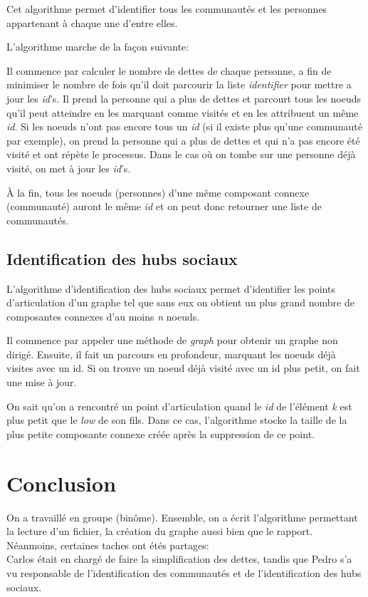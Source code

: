 \documentclass[11pt,a4paper]{article}
\begin{document}
Cet algorithme permet d'identifier tous les communautés et les
personnes appartenant à chaque une d'entre elles.\par L'algorithme
marche de la façon suivante:\par Il commence par calculer le nombre de
dettes de chaque personne, a fin de minimiser le nombre de fois qu'il
doit parcourir la liste \textit{identifier} pour mettre a jour les
\textit{id}'s.  Il prend la personne qui a plus de dettes et parcourt
tous les noeuds qu'il peut atteindre en les marquant comme visités et
en les attribuent un même \textit{id}.  Si les noeuds n'ont pas encore
tous un \textit{id} (si il existe plus qu'une communauté par exemple),
on prend la personne qui a plus de dettes et qui n'a pas encore été
visité et ont répète le processus.  Dans le cas où on tombe sur une
personne déjà visité, on met à jour les \textit{id}'s.\par À la fin,
tous les noeuds (personnes) d'une même composant connexe (communauté)
auront le même \textit{id} et on peut donc retourner une liste de
communautés.  


\subsection{Identification des hubs sociaux}

L'algorithme d'identification des hubs sociaux permet d'identifier les
points d'articulation d'un graphe tel que sans eux on obtient un plus
grand nombre de composantes connexes d'au moins \textit{n} noeuds.\par
Il commence par appeler une méthode de \textit{graph} pour obtenir un
graphe non dirigé.  Ensuite, il fait un parcours en profondeur,
marquant les noeuds déjà visites avec un id.  Si on trouve un noeud
déjà visité avec un id plus petit, on fait une mise à jour.\par On
sait qu'on a rencontré un point d'articulation quand le \textit{id} de
l'élément \textit{k} est plus petit que le \textit{low} de son
fils. Dans ce cas, l'algorithme stocke la taille de la plus petite
composante connexe créée après la suppression de ce point.




\section{Conclusion}

On a travaillé en groupe (binôme). Ensemble, on a écrit l'algorithme
permettant la lecture d'un fichier, la création du graphe aussi bien
que le rapport.\\ Néanmoins, certaines taches ont étés partages:\\
Carlos était en chargé de faire la simplification des dettes, tandis
que Pedro s'a vu responsable de l'identification des communautés et de
l'identification des hubs sociaux.
\end{document}
